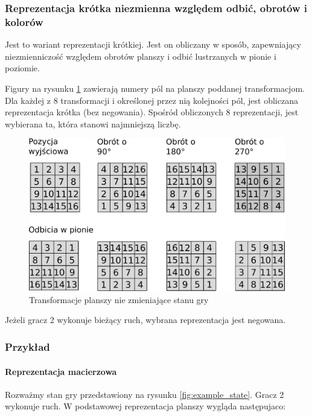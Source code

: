 \documentclass{scrartcl}
\begin{document}
\subsubsection{Reprezentacja krótka niezmienna względem odbić,
  obrotów i kolorów}
Jest to wariant reprezentacji krótkiej. Jest on obliczany w sposób,
zapewniający 
niezmienniczość względem obrotów planszy i odbić lustrzanych w pionie
i poziomie. 

Figury na rysunku \ref{fig:field_order2} zawierają numery pól na
planszy poddanej transformacjom. Dla każdej z 8 transformacji i
określonej przez nią kolejności pól, jest obliczana reprezentacja 
krótka (bez negowania). Spośród obliczonych 8 reprezentacji, 
jest wybierana ta, która stanowi najmniejszą liczbę.

\begin{figure}[h]
  \centering
  \includegraphics[width=\textwidth]{data/field_order2.pdf}
  \caption{Transformacje planszy nie zmieniające stanu gry}
  \label{fig:field_order2}
\end{figure}

Jeżeli gracz 2 wykonuje bieżący ruch, wybrana reprezentacja jest
negowana.

\subsubsection{Przykład}

\paragraph{Reprezentacja macierzowa} Rozważmy stan gry przedstawiony na rysunku \ref{fig:example_state}.
Gracz 2 wykonuje ruch. W podstawowej reprezentacja planszy wygląda
następujaco:
\end{document}
